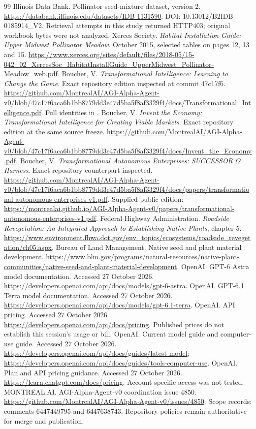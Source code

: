 \begin{thebibliography}{99}
 Illinois Data Bank. Pollinator seed-mixture dataset, version 2. \url{https://databank.illinois.edu/datasets/IDB-1131590}. DOI: 10.13012/B2IDB-0185914\_V2. Retrieval attempts in this study returned HTTP403; original workbook bytes were not analyzed.
 Xerces Society. \emph{Habitat Installation Guide: Upper Midwest Pollinator Meadow}. October 2015, selected tables on pages 12, 13 and 15. \url{https://www.xerces.org/sites/default/files/2018-05/15-042_02_XercesSoc_HabitatInstallGuide_UpperMidwest_Pollinator-Meadow_web.pdf}.
 Boucher, V. \emph{Transformational Intelligence: Learning to Change the Game}. Exact repository edition inspected at commit 47c17f6. \url{https://github.com/MontrealAI/AGI-Alpha-Agent-v0/blob/47c17f6aca6b1bb8779dd3e47d5ba5f8af3329f4/docs/Transformational_Intelligence.pdf}. Full identities in .
 Boucher, V. \emph{Invent the Economy: Transformational Intelligence for Creating Viable Markets}. Exact repository edition at the same source freeze. \url{https://github.com/MontrealAI/AGI-Alpha-Agent-v0/blob/47c17f6aca6b1bb8779dd3e47d5ba5f8af3329f4/docs/Invent_the_Economy.pdf}.
 Boucher, V. \emph{Transformational Autonomous Enterprises: SUCCESSOR $\Omega$ Harness}. Exact repository counterpart inspected. \url{https://github.com/MontrealAI/AGI-Alpha-Agent-v0/blob/47c17f6aca6b1bb8779dd3e47d5ba5f8af3329f4/docs/papers/transformational-autonomous-enterprises-v1.pdf}. Supplied public edition: \url{https://montrealai.github.io/AGI-Alpha-Agent-v0/papers/transformational-autonomous-enterprises-v1.pdf}.
 Federal Highway Administration. \emph{Roadside Revegetation: An Integrated Approach to Establishing Native Plants}, chapter 5. \url{https://www.environment.fhwa.dot.gov/env_topics/ecosystems/roadside_revegetation/ch05.aspx}.
 Bureau of Land Management. Native seed and plant material development. \url{https://www.blm.gov/programs/natural-resources/native-plant-communities/native-seed-and-plant-material-development}.
 OpenAI. GPT-6 Astra model documentation. Accessed 27 October 2026. \url{https://developers.openai.com/api/docs/models/gpt-6-astra}.
 OpenAI. GPT-6.1 Terra model documentation. Accessed 27 October 2026. \url{https://developers.openai.com/api/docs/models/gpt-6.1-terra}.
 OpenAI. API pricing. Accessed 27 October 2026. \url{https://developers.openai.com/api/docs/pricing}. Published prices do not establish this session's usage or bill.
 OpenAI. Current model guide and computer-use guide. Accessed 27 October 2026. \url{https://developers.openai.com/api/docs/guides/latest-model}; \url{https://developers.openai.com/api/docs/guides/tools-computer-use}.
 OpenAI. Plan and API pricing guidance. Accessed 27 October 2026. \url{https://learn.chatgpt.com/docs/pricing}. Account-specific access was not tested.
 MONTREAL.AI. AGI-Alpha-Agent-v0 coordination issue 4850. \url{https://github.com/MontrealAI/AGI-Alpha-Agent-v0/issues/4850}. Scope records: comments 6447449795 and 6447638743. Repository policies remain authoritative for merge and publication.
\end{thebibliography}
